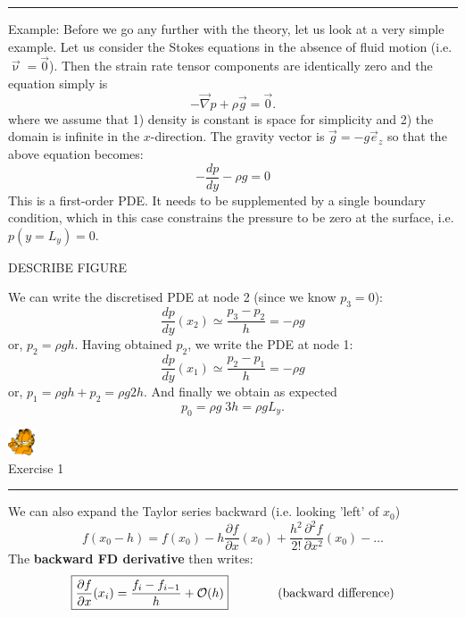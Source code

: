 \begin{center}
\begin{minipage}[t]{0.77\textwidth}
\par\noindent\rule{\textwidth}{0.4pt}
{\color{orange}Example:} Before we go any further with the theory, let us look at a very simple example. 
Let us consider the Stokes equations in the absence of fluid motion (i.e. $\vec\upnu=\vec 0$).
Then the strain rate tensor components are identically zero and the equation simply is 
\[
-\vec\nabla p + \rho \vec{g} = \vec 0.
\]
where we assume that 1) density is constant is space for simplicity and 2)
the domain is infinite in the $x$-direction.
The gravity vector is $\vec{g}=-g \vec{e}_z$ so that the above equation 
becomes:
\[
-\frac{dp}{dy} - \rho g = 0
\]
This is a first-order PDE. It needs to be supplemented by a single boundary condition, 
which in this case constrains the pressure to be zero at the surface, i.e. $p(y=L_y)=0$.



DESCRIBE FIGURE

We can write the discretised PDE at node 2 (since we know $p_3=0$):
\[
\frac{dp}{dy}(x_2) \simeq \frac{p_3-p_2}{h} = -\rho g
\]
or, $p_2=\rho g h$. Having obtained $p_2$, we write the PDE at node 1:
\[
\frac{dp}{dy}(x_1) \simeq \frac{p_2-p_1}{h} = -\rho g
\]
or, $p_1= \rho g h + p_2 = \rho g 2h$. And finally we obtain as expected
\[
p_0 = \rho g \; 3h = \rho g L_y.
\]

\begin{center}
\includegraphics[width=0.8cm]{images/garftr} \\
{\color{orange}Exercise 1}
\end{center}

\par\noindent\rule{\textwidth}{0.4pt}
\end{minipage}
\end{center}



\noindent We can also expand the Taylor series backward (i.e. looking 'left' of $x_0$)
\[
f(x_0-h)=f(x_0)-
h \frac{\partial f}{\partial x}(x_0)  + 
\frac{h^2}{2!} \frac{\partial^2 f}{\partial x^2}(x_0)  -
\dots 
\]
The {\bf backward FD derivative} then writes:
\[
\boxed{
\frac{\partial f}{\partial x}(x_i) = \frac{f_{i}-f_{i-1}}{h} + {\cal O}(h) 
}
\qquad
\qquad
\text{(backward difference)} 
\]

